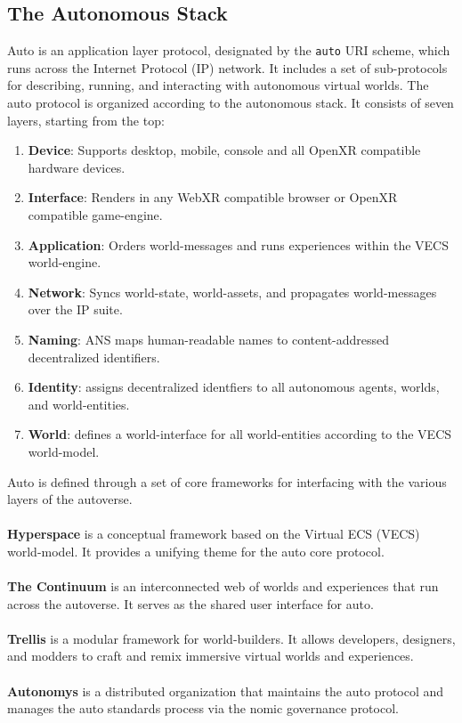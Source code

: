 \documentclass[twocolumn, 10pt]{article}
\begin{document}
\subsection{The Autonomous Stack}
Auto is an application layer protocol, designated by the \lstinline{auto} URI scheme, which runs across the Internet Protocol (IP) network. It includes a set of sub-protocols for describing, running, and interacting with autonomous virtual worlds. The auto protocol is organized according to the autonomous stack. It consists of seven layers, starting from the top:
\begin{enumerate}
    \item \textbf{Device}: Supports desktop, mobile, console and all OpenXR compatible hardware devices.
    \item \textbf{Interface}: Renders in any WebXR compatible browser or OpenXR compatible game-engine.
    \item \textbf{Application}: Orders world-messages and runs experiences within the VECS world-engine.
    \item \textbf{Network}: Syncs world-state, world-assets, and propagates world-messages over the IP suite.
    \item \textbf{Naming}: ANS maps human-readable names to content-addressed decentralized identifiers.
    \item \textbf{Identity}: assigns decentralized identfiers to all autonomous agents, worlds, and world-entities.
    \item \textbf{World}: defines a world-interface for all world-entities according to the VECS world-model.
\end{enumerate}
Auto is defined through a set of core frameworks for interfacing with the various layers of the autoverse.  
\\\\
\textbf{Hyperspace} is a conceptual framework based on the Virtual ECS (VECS) world-model. It provides a unifying theme for the auto core protocol.
\\\\
\textbf{The Continuum} is an interconnected web of worlds and experiences that run across the autoverse. It serves as the shared user interface for auto.
\\\\
\textbf{Trellis} is a modular framework for world-builders. It allows developers, designers, and modders to craft and remix immersive virtual worlds and experiences.
\\\\
\textbf{Autonomys} is a distributed organization that maintains the auto protocol and manages the auto standards process via the nomic governance protocol.
\end{document}
